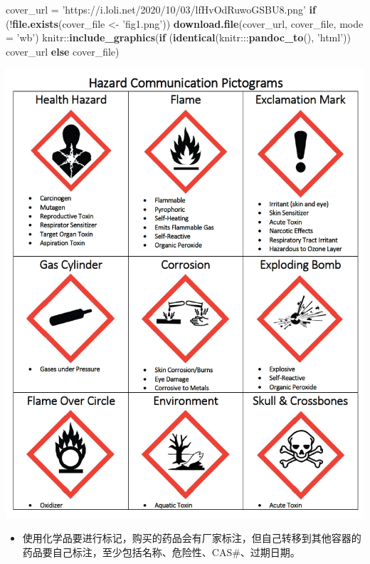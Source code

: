 \documentclass[]{tufte-book}
\newenvironment{Shaded}{}{}
\newcommand{\ControlFlowTok}[1]{\textcolor[rgb]{0.00,0.44,0.13}{\textbf{#1}}}
\newcommand{\DataTypeTok}[1]{\textcolor[rgb]{0.56,0.13,0.00}{#1}}
\newcommand{\KeywordTok}[1]{\textcolor[rgb]{0.00,0.44,0.13}{\textbf{#1}}}
\newcommand{\NormalTok}[1]{#1}
\newcommand{\OperatorTok}[1]{\textcolor[rgb]{0.40,0.40,0.40}{#1}}
\newcommand{\StringTok}[1]{\textcolor[rgb]{0.25,0.44,0.63}{#1}}
\providecommand{\tightlist}{%
  \setlength{\itemsep}{0pt}\setlength{\parskip}{0pt}}
\begin{document}
\begin{Shaded}
\begin{Highlighting}[]
\NormalTok{cover_url =}\StringTok{ 'https://i.loli.net/2020/10/03/lfHvOdRuwoGSBU8.png'}
\ControlFlowTok{if}\NormalTok{ (}\OperatorTok{!}\KeywordTok{file.exists}\NormalTok{(cover_file <-}\StringTok{ 'fig1.png'}\NormalTok{))}
  \KeywordTok{download.file}\NormalTok{(cover_url, cover_file, }\DataTypeTok{mode =} \StringTok{'wb'}\NormalTok{)}
\NormalTok{knitr}\OperatorTok{::}\KeywordTok{include_graphics}\NormalTok{(}\ControlFlowTok{if}\NormalTok{ (}\KeywordTok{identical}\NormalTok{(knitr}\OperatorTok{:::}\KeywordTok{pandoc_to}\NormalTok{(), }\StringTok{'html'}\NormalTok{)) cover_url }\ControlFlowTok{else}\NormalTok{ cover_file)}
\end{Highlighting}
\end{Shaded}

\includegraphics[width=11.94in]{fig1}

\begin{itemize}
\tightlist
\item
  使用化学品要进行标记，购买的药品会有厂家标注，但自己转移到其他容器的药品要自己标注，至少包括名称、危险性、CAS\#、过期日期。
\end{itemize}
\end{document}
